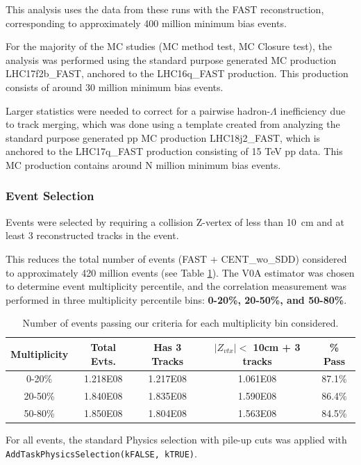 \documentclass[ALICE,manyauthors]{ALICE_analysis_notes}
\begin{document}
\begin{itemize}
This analysis uses the data from these runs with the FAST reconstruction, corresponding to approximately 400 million minimum bias events.

For the majority of the MC studies (MC method test, MC Closure test), the analysis was performed using the standard purpose generated MC production LHC17f2b\_FAST, anchored to the LHC16q\_FAST production. This production consists of around 30 million minimum bias events.

Larger statistics were needed to correct for a pairwise hadron-$\Lambda$ inefficiency due to track merging, which was done using a template created from analyzing the standard purpose generated pp MC production LHC18j2\_FAST, which is anchored to the LHC17q\_FAST production consisting of 15 TeV pp data. 
This MC production contains around N million minimum bias events.

\subsubsection{Event Selection}

Events were selected by requiring a collision Z-vertex of less than \SI{10}{cm} and at least 3 reconstructed tracks in the event.  

This reduces the total number of events (FAST + CENT\_wo\_SDD) considered to approximately 420 million events (see Table \ref{event_table}). The V0A estimator was chosen to determine event multiplicity percentile, and the correlation measurement was performed in three multiplicity percentile bins: \textbf{0-20\%, 20-50\%, and 50-80\%}.

\begin{table}[h!]
    \centering
\begin{tabular}{| c | c | c | c || c | }
\hline
Multiplicity & Total Evts. & Has 3 Tracks & $|Z_{vtx}| <$  10cm + 3 tracks & \% Pass \\
\hline
0-20\% & 1.218E08 & 1.217E08 & 1.061E08 & 87.1\%\\
20-50\% & 1.840E08 & 1.835E08 & 1.590E08 & 86.4\%\\
50-80\% & 1.850E08 & 1.804E08 & 1.563E08 & 84.5\%\\
\hline
\end{tabular}
\caption{Number of events passing our criteria for each multiplicity bin considered.}
\label{event_table}
\end{table}

For all events, the standard Physics selection with pile-up cuts was applied with \texttt{AddTaskPhysicsSelection(kFALSE, kTRUE)}.


\end{itemize}
\end{document}
